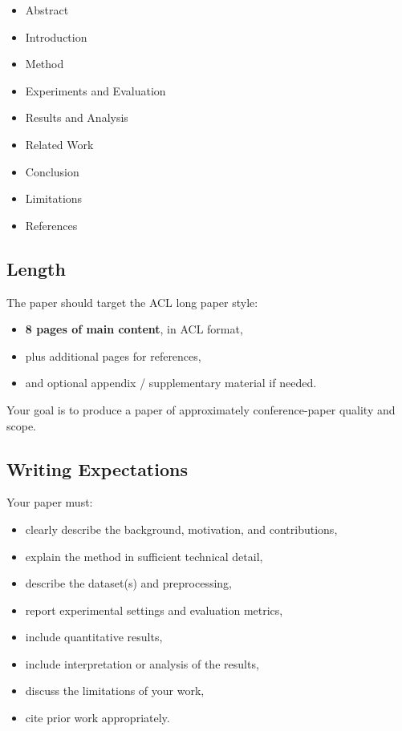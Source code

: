 \documentclass{article}
\begin{document}
\begin{itemize}
  \item Abstract
  \item Introduction
  \item Method
  \item Experiments and Evaluation
  \item Results and Analysis
  \item Related Work
  \item Conclusion
  \item Limitations
  \item References
\end{itemize}

\subsection{Length}

The paper should target the ACL long paper style:
\begin{itemize}
  \item \textbf{8 pages of main content}, in ACL format,
  \item plus additional pages for references,
  \item and optional appendix / supplementary material if needed.
\end{itemize}

\noindent Your goal is to produce a paper of approximately conference-paper quality and scope.

\subsection{Writing Expectations}

Your paper must:

\begin{itemize}
  \item clearly describe the background, motivation, and contributions,
  \item explain the method in sufficient technical detail,
  \item describe the dataset(s) and preprocessing,
  \item report experimental settings and evaluation metrics,
  \item include quantitative results,
  \item include interpretation or analysis of the results,
  \item discuss the limitations of your work,
  \item cite prior work appropriately.
\end{itemize}
\end{document}
